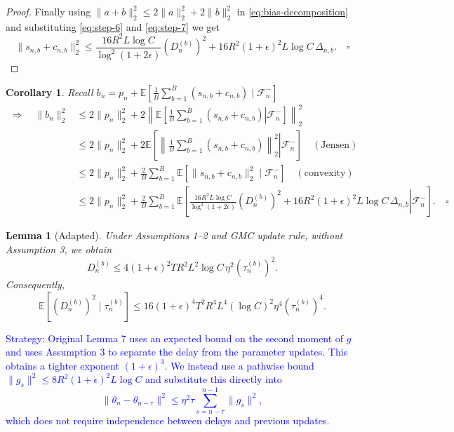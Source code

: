 \documentclass[10pt]{article}
\newcommand{\E}{\mathbb{E}}
\newcommand{\F}{\mathcal{F}}
\theoremstyle{preserved}
\newtheorem{lemma}{Lemma}
\newtheorem*{corollary}{Corollary}
\begin{document}
\begin{proof}
Finally using $\|a+b\|_2^2\le2\|a\|_2^2+2\|b\|_2^2$ in \eqref{eq:bias-decomposition} and substituting \eqref{eq:step-6} and \eqref{eq:step-7} we get
\begin{equation*}
\|s_{n,b}+c_{n,b}\|_2^2\le\frac{16R^2L\log C}{\log^2(1+2\epsilon)}(D_n^{(b)})^2+16R^2(1+\epsilon)^2L\log C\,\Delta_{n,b}.\quad\square
\end{equation*}
\end{proof}

\begin{corollary} Recall $b_n=p_n+\E[\frac1B\sum_{b=1}^B(s_{n,b}+c_{n,b})\mid\F_n^-]$
\begin{equation*}
\begin{aligned}
\Rightarrow\quad\|b_n\|_2^2
&\le2\|p_n\|_2^2+2\left\|\E\left[\left.\frac1B\sum_{b=1}^B(s_{n,b}+c_{n,b})\right|\F_n^-\right]\right\|_2^2\\
&\le2\|p_n\|_2^2+2\E\left[\left.\left\|\frac1B\sum_{b=1}^B(s_{n,b}+c_{n,b})\right\|_2^2\right|\F_n^-\right]\quad(\text{Jensen})\\
&\le2\|p_n\|_2^2+\frac2B\sum_{b=1}^B\E[\|s_{n,b}+c_{n,b}\|_2^2\mid\F_n^-]\quad(\text{convexity})\\
&\le2\|p_n\|_2^2+\frac2B\sum_{b=1}^B\E\left[\left.\frac{16R^2L\log C}{\log^2(1+2\epsilon)}(D_n^{(b)})^2+16R^2(1+\epsilon)^2L\log C\,\Delta_{n,b}\right|\F_n^-\right].\quad\square
\end{aligned}
\end{equation*}

\end{corollary}

\setcounter{lemma}{6}
\begin{lemma}[Adapted] Under Assumptions 1--2 and GMC update rule, without Assumption 3, we obtain
\begin{equation*}
D_n^{(b)}\le4(1+\epsilon)^2TR^2L^2\log C\,\eta^2(\tau_n^{(b)})^2.
\end{equation*}
Consequently,
\begin{equation*}
\E[(D_n^{(b)})^2\mid\tau_n^{(b)}]\le16(1+\epsilon)^4T^2R^4L^4(\log C)^2\eta^4(\tau_n^{(b)})^4.
\end{equation*}
\end{lemma}

\textcolor{blue}{Strategy: Original Lemma 7 uses an expected bound on the second moment of $g$ and uses Assumption 3 to separate the delay from the parameter updates. This obtains a tighter exponent $(1 + \epsilon)^3$. We instead use a pathwise bound $\|g_s\|^2\le 8R^2(1+\epsilon)^2L\log C$ and substitute this directly into 
$$
\|\theta_n-\theta_{n-\tau}\|^2
\le\eta^2\tau\sum_{s=n-\tau}^{n-1}\|g_s\|^2,
$$ 
which does not require independence between delays and previous updates.}
\end{document}
